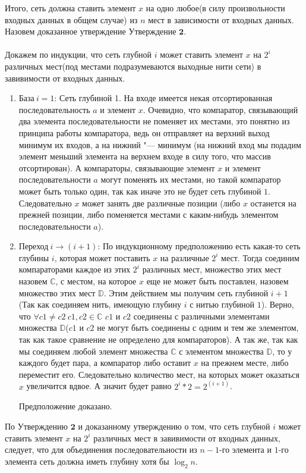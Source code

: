 \documentclass{article}
\begin{document}
Итого, сеть должна ставить элемент $x$ на одно любое(в силу произвольности входных данных в общем случае) из $n$ мест в зависимости от входных данных. Назовем доказанное утверждение $\textbf{Утверждение 2}$.
\\\\
Докажем по индукции, что сеть глубной $i$ может ставить элемент $x$ на $2^i$ различных мест(под местами подразумеваются выходные нити сети) в завивимости от входных данных. 
\begin{enumerate}
\item $\textbf{База} \ i = 1$: Сеть глубиной 1. На входе имеется некая отсортированная последовательность $a$ и элемент $x$. Очевидно, что компаратор, связывающий два элемента последовательности не поменяет их местами, это понятно из принципа работы компаратора, ведь он отправляет на верхний выход минимум их входов, а на нижний "--- минимум (на нижний вход мы подадим элемент меньший элемента на верхнем входе в силу того, что массив отсортирован). А компараторы, связывающие элемент $x$ и элемент последовательности $a$ могут поменять их местами, но такой компаратор может быть только один, так как иначе это не будет сеть глубиной $1$. Следовательно $x$ может занять две различные позиции (либо $x$ останется на прежней позиции, либо поменяется местами с каким-нибудь элементом последовательности $a$).
\item $\textbf{Переход} \ i \rightarrow (i + 1)$: По индукционному предположению есть какая-то сеть глубины $i$, которая может поставить $x$ на различные $2^i$ мест. Тогда соединим компараторами каждое из этих $2^i$ различных мест, множество этих мест назовем $\mathbb{C}$, с местом, на которое $x$ еще не может быть поставлен, назовем множество этих мест $\mathbb{D}$. Этим действием мы получим сеть глубиной $i + 1$ (Так как соединяем нить, имеющую глубину $i$ с нитью глубиной $1$). Верно, что $\forall c1 \neq c2 \ c1, c2 \in \mathbb{C}$ $c1$ и $c2$ соединены с различными элементами множества $\mathbb{D}$($c1$ и $c2$ не могут быть соединены с одним и тем же элементом, так как такое сравнение не определено для компараторов). А так же, так как мы соединяем любой элемент множества $\mathbb{C}$ с элементом множества $\mathbb{D}$, то у каждого будет пара, а компаратор либо оставит $x$ на прежнем месте, либо переместит его. Следовательно количество мест, на которых может оказаться $x$ увеличится вдвое. А значит будет равно $2^i * 2 = 2^{(i + 1)}$.

Предположение доказано.
\end{enumerate}
По $\textbf{Утверждению 2}$ и доказанному утверждению о том, что сеть глубной $i$ может ставить элемент $x$ на $2^i$ различных мест в завивимости от входных данных, следует, что для объединения последовательности из $n - 1$-го элемента и $1$-го элемента сеть должна иметь глубину хотя бы $\log_2{n}$.
\end{document}

